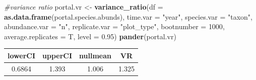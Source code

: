 \documentclass[]{article}
\newenvironment{Shaded}{\begin{snugshade}}{\end{snugshade}}
\newcommand{\KeywordTok}[1]{\textcolor[rgb]{0.13,0.29,0.53}{\textbf{{#1}}}}
\newcommand{\DataTypeTok}[1]{\textcolor[rgb]{0.13,0.29,0.53}{{#1}}}
\newcommand{\DecValTok}[1]{\textcolor[rgb]{0.00,0.00,0.81}{{#1}}}
\newcommand{\FloatTok}[1]{\textcolor[rgb]{0.00,0.00,0.81}{{#1}}}
\newcommand{\StringTok}[1]{\textcolor[rgb]{0.31,0.60,0.02}{{#1}}}
\newcommand{\CommentTok}[1]{\textcolor[rgb]{0.56,0.35,0.01}{\textit{{#1}}}}
\newcommand{\NormalTok}[1]{{#1}}
\begin{document}
\begin{Shaded}
\begin{Highlighting}[]
\CommentTok{#variance ratio}
\NormalTok{portal.vr <-}\StringTok{ }\KeywordTok{variance_ratio}\NormalTok{(}\DataTypeTok{df =} \KeywordTok{as.data.frame}\NormalTok{(portal.species.abunds),}
                            \DataTypeTok{time.var =} \StringTok{"year"}\NormalTok{, }\DataTypeTok{species.var =} \StringTok{"taxon"}\NormalTok{,}
                            \DataTypeTok{abundance.var =} \StringTok{"n"}\NormalTok{, }\DataTypeTok{replicate.var =} \StringTok{"plot_type"}\NormalTok{,}
                            \DataTypeTok{bootnumber =} \DecValTok{1000}\NormalTok{, }\DataTypeTok{average.replicates =} \NormalTok{T,}
                            \DataTypeTok{level =} \FloatTok{0.95}\NormalTok{)}
\KeywordTok{pander}\NormalTok{(portal.vr)}
\end{Highlighting}
\end{Shaded}

\begin{longtable}[]{@{}cccc@{}}
\toprule
\begin{minipage}[b]{0.12\columnwidth}\centering\strut
lowerCI\strut
\end{minipage} & \begin{minipage}[b]{0.12\columnwidth}\centering\strut
upperCI\strut
\end{minipage} & \begin{minipage}[b]{0.14\columnwidth}\centering\strut
nullmean\strut
\end{minipage} & \begin{minipage}[b]{0.06\columnwidth}\centering\strut
VR\strut
\end{minipage}\tabularnewline
\midrule
\endhead
\begin{minipage}[t]{0.12\columnwidth}\centering\strut
0.6864\strut
\end{minipage} & \begin{minipage}[t]{0.12\columnwidth}\centering\strut
1.393\strut
\end{minipage} & \begin{minipage}[t]{0.14\columnwidth}\centering\strut
1.006\strut
\end{minipage} & \begin{minipage}[t]{0.06\columnwidth}\centering\strut
1.325\strut
\end{minipage}\tabularnewline
\bottomrule
\end{longtable}
\end{document}

